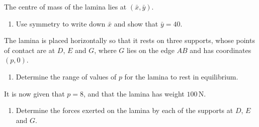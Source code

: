 \documentclass[leqno]{article}
\begin{document}
\begin{enumerate}[
  label=\textbf{\arabic*.},
  leftmargin=*,
  topsep=0pt,
  partopsep=0pt,
  parsep=0pt
]
The centre of mass of the lamina lies at $(\bar{x},\bar{y})$. \\
\begin{enumerate}[label=\textbf{(\alph*)}]
  \item Use symmetry to write down $\bar{x}$ and show that $\bar{y}=40$.  \\
\end{enumerate}
The lamina is placed horizontally so that it rests on three supports, whose points of contact are at $D$, $E$ and $G$, where $G$ lies on the edge $AB$ and has coordinates $(p,0)$. \\
\begin{enumerate}[label=\textbf{(\alph*)}, resume]
  \item Determine the range of values of $p$ for the lamina to rest in equilibrium.  \\
\end{enumerate}
It is now given that $p=8$, and that the lamina has weight $100\,\mathrm{N}$. \\
\begin{enumerate}[label=\textbf{(\alph*)}, resume]
  \item Determine the forces exerted on the lamina by each of the supports at $D$, $E$ and $G$.  \\
\end{enumerate}

\newpage

\questionitem

\begin{figure}[H]
    \centering
{}
\end{figure}
\end{enumerate}
\end{document}
